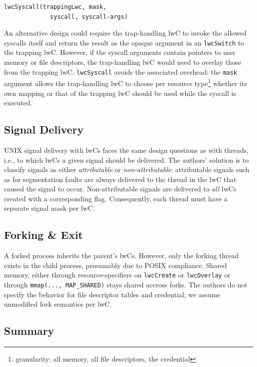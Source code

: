 \documentclass[10pt,twocolumn,letter]{article}
\begin{document}
\begin{lstlisting}[float=h]
  lwcSyscall(trappingLwc, mask,
             syscall, syscall-args)
\end{lstlisting}

An alternative design could require the trap-handling lwC to invoke the allowed syscalls itself and return the result as the opaque argument in an \lstinline{lwcSwitch} to the trapping lwC.
However, if the syscall arguments contain pointers to user memory or file descriptors, the trap-handling lwC would need to overlay those from the trapping lwC.
\lstinline{lwcSyscall} avoids the associated overhead:
the \lstinline{mask} argument allows the trap-handling lwC to choose per resource type\footnote{granularity: all memory, all file descriptors, the credential} whether its own mapping or that of the trapping lwC should be used while the syscall is executed.


\subsection{Signal Delivery}
UNIX signal delivery with lwCs faces the same design questions as with threads, i.e., to which lwCs a given signal should be delivered.
The authors' solution is to classify signals as either \textit{attributable} or \textit{non-attributable}:
attributable signals such as for segmentation faults are always delivered to the thread in the lwC that caused the signal to occur.
Non-attributable signals are delivered to \textit{all} lwCs created with a corresponding flag.
Consequently, each thread must have a separate signal mask per lwC.

\subsection{Forking \& Exit}
A forked process inherits the parent's lwCs.
However, only the forking thread exists in the child process, presumably due to POSIX compliance\cite{forkmultithread}. %
Shared memory, either through resource-specifiers on \lstinline{lwcCreate} or \lstinline{lwcOverlay} or through \lstinline{mmap(..., MAP_SHARED)} stays shared accross forks.
The authors do not specify the behavior for file descriptor tables and credential; we assume unmodified fork semantics per lwC.

\subsection{Summary}
\end{document}
